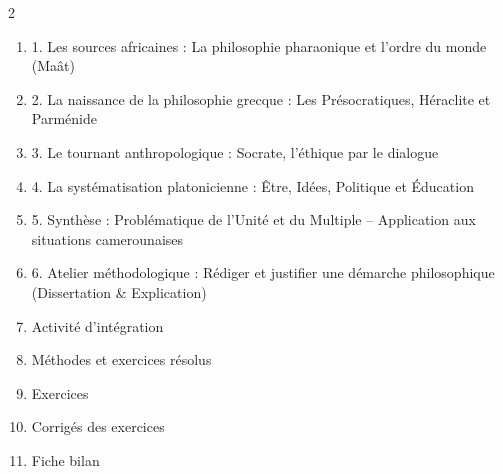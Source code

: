 \documentclass[11pt]{article}
\begin{document}
\begin{sommaire}
\begin{multicols}{2}
\begin{enumerate}
\item 1. Les sources africaines : La philosophie pharaonique et l'ordre du monde (Maât)
\item 2. La naissance de la philosophie grecque : Les Présocratiques, Héraclite et Parménide
\item 3. Le tournant anthropologique : Socrate, l'éthique par le dialogue
\item 4. La systématisation platonicienne : Être, Idées, Politique et Éducation
\item 5. Synthèse : Problématique de l'Unité et du Multiple – Application aux situations camerounaises
\item 6. Atelier méthodologique : Rédiger et justifier une démarche philosophique (Dissertation \& Explication)
\item Activité d'intégration
\item Méthodes et exercices résolus
\item Exercices
\item Corrigés des exercices
\item Fiche bilan
\end{enumerate}
\end{multicols}
\end{sommaire}
\end{document}
